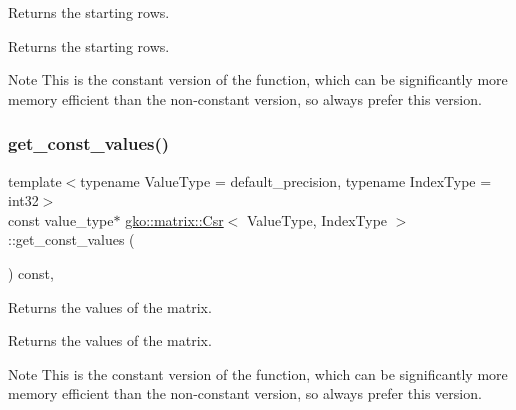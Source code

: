Returns the starting rows. 

\begin{DoxyReturn}{Returns}
the starting rows.
\end{DoxyReturn}
\begin{DoxyNote}{Note}
This is the constant version of the function, which can be significantly more memory efficient than the non-\/constant version, so always prefer this version. 
\end{DoxyNote}
\mbox{\label{classgko_1_1matrix_1_1Csr_a1801347665214bbefc837b44ba0695ff}} 
\subsubsection{\texorpdfstring{get\+\_\+const\+\_\+values()}{get\_const\_values()}}
{\footnotesize\ttfamily template$<$typename Value\+Type = default\+\_\+precision, typename Index\+Type = int32$>$ \\
const value\+\_\+type$\ast$ \hyperlink{classgko_1_1matrix_1_1Csr}{gko\+::matrix\+::\+Csr}$<$ Value\+Type, Index\+Type $>$\+::get\+\_\+const\+\_\+values (\begin{DoxyParamCaption}{ }\end{DoxyParamCaption}) const\hspace{0.3cm}{\ttfamily [inline]}, {\ttfamily [noexcept]}}



Returns the values of the matrix. 

\begin{DoxyReturn}{Returns}
the values of the matrix.
\end{DoxyReturn}
\begin{DoxyNote}{Note}
This is the constant version of the function, which can be significantly more memory efficient than the non-\/constant version, so always prefer this version. 
\end{DoxyNote}
\mbox{\label{classgko_1_1matrix_1_1Csr_a5b8c25c2fb1bbea62a3afdec8f8340c5}} 
